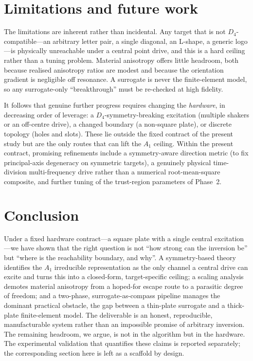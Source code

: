 \documentclass[11pt,a4paper]{article}
\newcommand{\Aone}{A_1}
\newcommand{\Dfour}{D_4}
\begin{document}
\section{Limitations and future work}\label{sec:limits}

The limitations are inherent rather than incidental. Any target that is not
$\Dfour$-compatible---an arbitrary letter pair, a single diagonal, an L-shape, a
generic logo---is physically unreachable under a central point drive, and this is a
hard ceiling rather than a tuning problem. Material anisotropy offers little
headroom, both because realised anisotropy ratios are modest and because the
orientation gradient is negligible off resonance. A surrogate is never the
finite-element model, so any surrogate-only ``breakthrough'' must be re-checked at
high fidelity.

It follows that genuine further progress requires changing the
\emph{hardware}, in decreasing order of leverage: a $\Dfour$-symmetry-breaking
excitation (multiple shakers or an off-centre drive), a changed boundary (a
non-square plate), or discrete topology (holes and slots). These lie outside the
fixed contract of the present study but are the only routes that can lift the
$\Aone$ ceiling. Within the present contract, promising refinements include a
symmetry-aware direction metric (to fix principal-axis degeneracy on symmetric
targets), a genuinely physical time-division multi-frequency drive rather than a
numerical root-mean-square composite, and further tuning of the trust-region
parameters of Phase~2.

\section{Conclusion}\label{sec:conclusion}

Under a fixed hardware contract---a square plate with a single central
excitation---we have shown that the right question is not ``how strong can the
inversion be'' but ``where is the reachability boundary, and why''. A
symmetry-based theory identifies the $\Aone$ irreducible representation as the only
channel a central drive can excite and turns this into a closed-form, target-specific
ceiling; a scaling analysis demotes material anisotropy from a hoped-for escape
route to a parasitic degree of freedom; and a two-phase, surrogate-as-compass
pipeline manages the dominant practical obstacle, the gap between a thin-plate
surrogate and a thick-plate finite-element model. The deliverable is an honest,
reproducible, manufacturable system rather than an impossible promise of arbitrary
inversion. The remaining headroom, we argue, is not in the algorithm but in the
hardware. The experimental validation that quantifies these claims is reported
separately; the corresponding section here is left as a scaffold by design.
\end{document}
